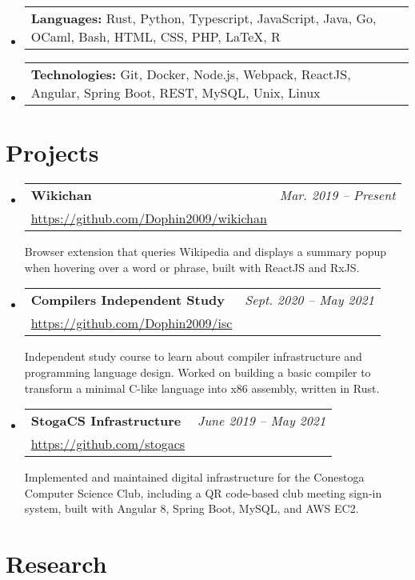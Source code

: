 \documentclass[letterpaper,11pt]{article}
\makeatletter
\newcommand{\resumeSubheading}[4]{
  \vspace{-2pt}\item
    \begin{tabular*}{0.97\textwidth}[t]{l@{\extracolsep{\fill}}r}
      \textbf{#1} & #2 \\
      {#3} & \textit{\small #4} \\[3pt]
    \end{tabular*}\vspace{-5pt}
}
\newcommand{\resumeSubheadingDescription}[1]{
  \parbox{0.97\textwidth}{#1}
}
\newcommand{\resumeSubSubSubheading}[2]{
  \vspace{3pt}
  \item \begin{tabular*}{0.97\textwidth}{l}
      \textbf{#1:} #2 \\
    \end{tabular*}\vspace{-8pt}
}
\newenvironment{resumeSubHeadingList}{\begin{itemize}[leftmargin=*, label={}]}{\end{itemize}}
\makeatother
\begin{document}
  \begin{resumeSubHeadingList}
    \resumeSubSubSubheading{Languages}%
      {Rust, Python, Typescript, JavaScript, Java, Go, OCaml, Bash, HTML, CSS, PHP, LaTeX, R}
    \resumeSubSubSubheading{Technologies}%
      {Git, Docker, Node.js, Webpack, ReactJS, Angular, Spring Boot, REST, MySQL, Unix, Linux}
  \end{resumeSubHeadingList}

  \vspace*{0pt}

\section{Projects}

  \begin{resumeSubHeadingList}
    \resumeSubheading%
      {Wikichan}%
      {\small\itshape Mar. 2019 -- Present}%
      {\small \url{https://github.com/Dophin2009/wikichan}}%
      {}

      \resumeSubheadingDescription{
        Browser extension that queries Wikipedia and displays a summary popup when hovering over a
        word or phrase, built with ReactJS and RxJS.
      }

    \resumeSubheading%
      {Compilers Independent Study}%
      {\small\itshape Sept. 2020 -- May 2021}%
      {\small \url{https://github.com/Dophin2009/isc}}%
      {}

      \resumeSubheadingDescription{
        Independent study course to learn about compiler infrastructure and programming language
        design. Worked on building a basic compiler to transform a minimal C-like language into x86
        assembly, written in Rust.
      }

    \resumeSubheading%
      {StogaCS Infrastructure}%
      {\small\itshape June 2019 -- May 2021}%
      {\small \url{https://github.com/stogacs}}%
      {}

      \resumeSubheadingDescription{
        Implemented and maintained digital infrastructure for the Conestoga Computer Science Club,
        including a QR code-based club meeting sign-in system, built with Angular 8, Spring Boot,
        MySQL, and AWS EC2.
      }
  \end{resumeSubHeadingList}

\section{Research}
\end{document}
